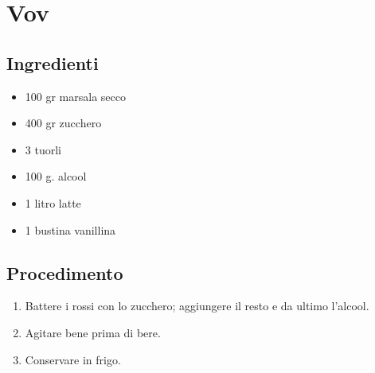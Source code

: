 \section{Vov}
\subsection{Ingredienti}
\begin{itemize}
\item 100 gr marsala secco  
\item 400 gr zucchero  
\item 3 tuorli  
\item 100 g. alcool  
\item 1 litro latte  
\item 1 bustina vanillina
\end{itemize}
\subsection{Procedimento}
\begin{enumerate}
\item  Battere i rossi con lo zucchero; aggiungere il resto e da ultimo l'alcool.   
\item  Agitare bene prima di bere.   
\item  Conservare in frigo.
\end{enumerate}
